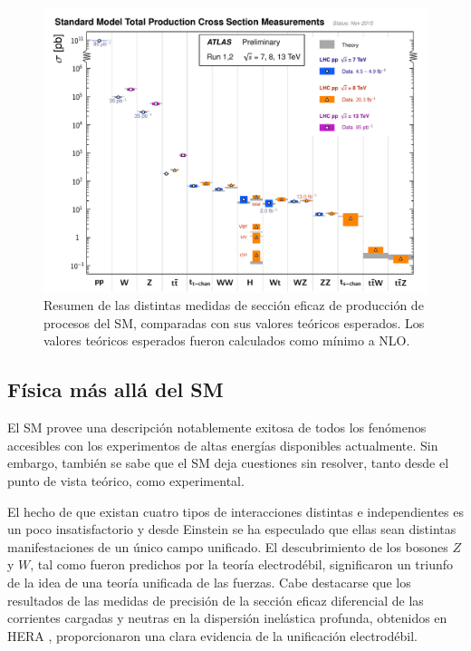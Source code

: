 \begin{figure}[!htb]
  \centering
  \includegraphics[width=1\textwidth]{figures/ATLAS_a_SMSummary_TotalXsect_new.pdf}
  \caption{Resumen de las distintas medidas de sección eficaz de producción de
    procesos del SM, comparadas con sus valores teóricos esperados.
    Los valores teóricos esperados fueron calculados como mínimo a NLO\cite{ATLASSM}.}
  \label{fig:sm_atlas_xs}
\end{figure}




\subsection{Física más allá del SM}

El SM provee una descripción notablemente exitosa de todos los fenómenos
accesibles con los experimentos de altas energías disponibles actualmente. Sin
embargo, también se sabe que el SM deja cuestiones sin resolver, tanto desde el
punto de vista teórico, como experimental.

El hecho de que existan cuatro tipos de interacciones distintas e independientes
es un poco insatisfactorio y desde Einstein se ha especulado que ellas sean
distintas manifestaciones de un único campo unificado. El descubrimiento de los
bosones $Z$ y $W$, tal como fueron predichos por la teoría electrodébil,
significaron un triunfo de la idea de una teoría unificada de las fuerzas. Cabe
destacarse que los resultados de las medidas de precisión de la sección eficaz
diferencial de las corrientes cargadas y neutras en la dispersión inelástica
profunda, obtenidos en HERA \cite{Hera}, proporcionaron una clara evidencia de
la unificación electrodébil.


